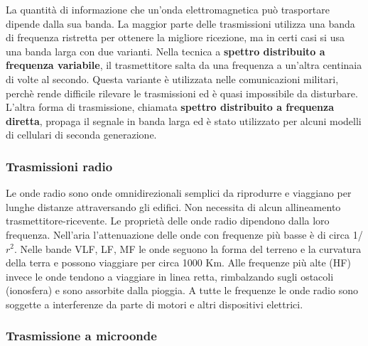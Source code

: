 La quantità di informazione che un'onda elettromagnetica può trasportare dipende dalla sua banda. La maggior parte delle trasmissioni utilizza una banda di frequenza ristretta per ottenere la migliore ricezione, ma in certi casi si usa una banda larga con due varianti. Nella tecnica a \textbf{spettro distribuito a frequenza variabile}, il trasmettitore salta da una frequenza a un'altra centinaia di volte al secondo. Questa variante è utilizzata nelle comunicazioni militari, perchè rende difficile rilevare le trasmissioni ed è quasi impossibile da disturbare.
L'altra forma di trasmissione, chiamata \textbf{spettro distribuito a frequenza diretta}, propaga il segnale in banda larga ed è stato utilizzato per alcuni modelli di cellulari di seconda generazione.

\subsubsection{Trasmissioni radio}

Le onde radio sono onde omnidirezionali semplici da riprodurre e viaggiano per lunghe distanze attraversando gli edifici. Non necessita di alcun allineamento trasmettitore-ricevente. Le proprietà delle onde radio dipendono dalla loro frequenza. Nell'aria l'attenuazione delle onde con frequenze più basse è di circa 1/\(r^2\). Nelle bande VLF, LF, MF le onde seguono la forma del terreno e la curvatura della terra e possono viaggiare per circa 1000 Km. Alle frequenze più alte (HF) invece le onde tendono a viaggiare in linea retta, rimbalzando sugli ostacoli (ionosfera) e sono assorbite dalla pioggia. 
A tutte le frequenze le onde radio sono soggette a interferenze da parte di motori e altri dispositivi elettrici. 

\subsubsection{Trasmissione a microonde}

